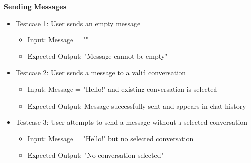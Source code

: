 \noindent
\textbf{Sending Messages}
\begin{itemize}
    \item Testcase 1: User sends an empty message
    \begin{itemize}
        \item Input: Message = ""
        \item Expected Output: "Message cannot be empty"
    \end{itemize}

    \item Testcase 2: User sends a message to a valid conversation
    \begin{itemize}
        \item Input: Message = "Hello!" and existing conversation is selected
        \item Expected Output: Message successfully sent and appears in chat history
    \end{itemize}

    \item Testcase 3: User attempts to send a message without a selected conversation
    \begin{itemize}
        \item Input: Message = "Hello!" but no selected conversation
        \item Expected Output: "No conversation selected"
    \end{itemize}
\end{itemize}

